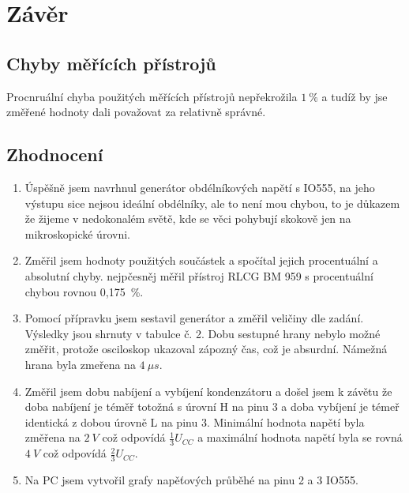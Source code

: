 \section{Závěr}
  
  
  \subsection{Chyby měřících přístrojů}
    \indent\indent
    Procnruální chyba použitých měřících přístrojů nepřekrožila $1~\%$ a tudíž by jse změřené hodnoty dali považovat za relativně správné.
  
  \subsection{Zhodnocení}
    \begin{enumerate}
      \item
        Úspěšně jsem navrhnul generátor obdélníkových napětí s IO555, na jeho výstupu sice nejsou ideální obdélníky, ale to není mou chybou, to je důkazem že žijeme v nedokonalém světě, kde se věci pohybují skokově jen na mikroskopické úrovni.
      \item
        Změřil jsem hodnoty použitých součástek a spočítal jejich procentuální a absolutní chyby. nejpčesněj měřil přístroj RLCG BM 959 s procentuální chybou rovnou 0,175~\%.
      \item
        Pomocí přípravku jsem sestavil generátor a změřil veličiny dle zadání. Výsledky jsou shrnuty v tabulce č. 2. Dobu sestupné hrany nebylo možné změřit, protože osciloskop ukazoval zápozný čas, což je absurdní. Námežná hrana byla zmeřena na $4~\mu s$.
      \item
        Změřil jsem dobu nabíjení a vybíjení kondenzátoru a došel jsem k závětu že doba nabíjení je téměř totožná s úrovní H na pinu 3 a doba vybíjení je témeř identická z dobou úrovně L na pinu 3. Minimální hodnota napětí byla změřena na $2~V$ což odpovídá $\frac{1}{3}U_{CC}$ a maximální hodnota napětí byla se rovná $4~V$ což odpovídá $\frac{2}{3}U_{CC}$.
      \item
        Na PC jsem vytvořil grafy napěťových průběhé na pinu 2 a 3 IO555.
    \end{enumerate}
